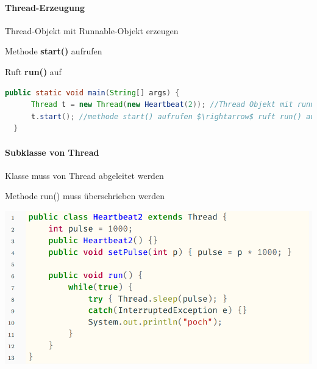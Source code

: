 \documentclass[10pt]{article}
\begin{document}
  \paragraph{Thread-Erzeugung}

  \begin{itemize*}
    \item Thread-Objekt mit Runnable-Objekt erzeugen
    \item Methode \textbf{start()} aufrufen
    \begin{itemize*}
      \item Ruft \textbf{run()} auf
    \end{itemize*}
  \end{itemize*}
  \begin{lstlisting}[language=java]
  public static void main(String[] args) {
      Thread t = new Thread(new Heartbeat(2)); //Thread Objekt mit runnable erzeugen
      t.start(); //methode start() aufrufen $\rightarrow$ ruft run() auf
  }
  \end{lstlisting}
  
  \paragraph{Subklasse von Thread}
  
  \begin{itemize*}
    \item Klasse muss von Thread abgeleitet werden
    \item Methode run() muss überschrieben werden
  \end{itemize*}
  \begin{center}
    \includegraphics[width=0.4\linewidth]{Assets/Programmierparadigmen-code-snippet-49}
  \end{center}
  
\end{document}
